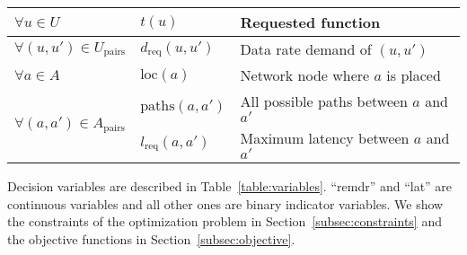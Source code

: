 \documentclass[10pt,a4paper,conference]{IEEEtran}
\begin{document}
\begin{table}[!t]
\begin{tabular}{lll}
$ \forall u {\in} U $                                      & $ t(u) $                & Requested function               \\ \hline
$ \forall (u,u') {\in} U_{\text{pairs}} $                  & $ d_\text{req}(u, u') $ & Data rate demand of $ (u,u') $                            \\ \hline
$ \forall a {\in} A $                                      & $ \text{loc}(a) $       & Network node where $ a $ is placed \\ \hline
\multirow{2}{*}{$ \forall (a,a') {\in} A_{\text{pairs}} $} & $ \text{paths}(a, a') $ & All possible paths between $ a $ and $ a' $        \\  
                                                         & $ l_\text{req}(a,a') $  & Maximum latency between $ a $ and $ a' $  \\ \hline
\end{tabular}
\end{table}


Decision variables are described in Table~\ref{table:variables}. 
``remdr'' and ``lat'' are continuous variables and all other ones are binary 
indicator variables. We show the constraints of the optimization problem in 
Section~\ref{subsec:constraints} and the objective functions in Section~\ref{subsec:objective}.
\end{document}
